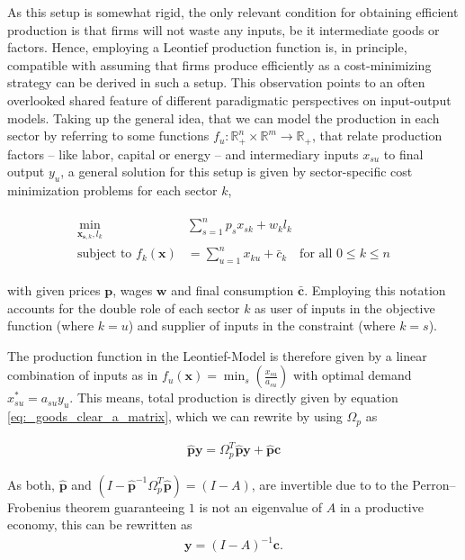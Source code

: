 \documentclass{article}
\newcommand{\hbf}[1]{\hat {\mathbf #1}}
\begin{document}
As this setup is somewhat rigid, the only relevant condition for obtaining efficient production is that firms will not waste any inputs, be it intermediate goods or factors. Hence, employing a Leontief production function is, in principle, compatible with assuming that firms produce efficiently as a cost-minimizing strategy can be derived in such a setup. This observation points to an often overlooked shared feature of different paradigmatic perspectives on input-output models. Taking up the general idea, that we can model the production in each sector by referring to some functions $f_u: \mathbb R^n_+ \times \mathbb R^m \to \mathbb R_+$, that relate production factors -- like labor, capital or energy -- and intermediary inputs $x_{su}$ to final output $y_u$, a general solution for this setup is given by sector-specific cost minimization problems for each sector $k$,

\begin{align}
  \label{eq:costmin}
  \begin{split}
        \min_{\mathbf x_{\mathbf{s},k},l_k}  &  \sum_{s = 1}^n p_s x_{sk}  + w_k l_k\\
  \text{subject to }  f_k(\mathbf x) & = \sum_{u=1}^n x_{ku} + \bar c_k \quad \text{for all } 0 \leq k \leq n
  \end{split}
\end{align}

with given prices $\mathbf p$, wages $\mathbf w$ and final consumption $\bar{\mathbf c}$. Employing this notation accounts for the double role of each sector $k$ as user of inputs in the objective function (where $k=u$) and supplier of inputs in the constraint (where $k=s$).

The production function in the Leontief-Model is therefore given by a linear combination of inputs as in $f_u(\mathbf x) = \min_s(\frac {x_{su}}{a_{su}})$ with optimal demand $x_{su}^* = a_{su} y_u$.
This means, total production is directly given by equation \eqref{eq:_goods_clear_a_matrix}, which we can rewrite by using $\Omega_p$ as

\begin{align}
    \hbf p \mathbf y =\Omega_p^T \hbf{p} \mathbf y + \hbf p \mathbf  c
\end{align}

As both, $\hbf{p}$ and $(I - \hbf p^{-1} \Omega_p^T \hbf{p}) = (I - A)$, are invertible due to to the Perron–Frobenius theorem guaranteeing $1$ is not an eigenvalue of $A$ in a productive economy, this can be rewritten as
\begin{align} \label{eq:leontief_effect}
  \mathbf y = (I - A)^{-1} \mathbf c.
\end{align}
\end{document}
